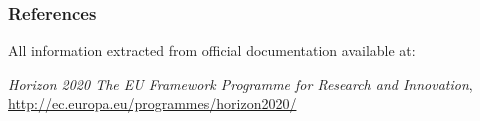 \documentclass[compress,9pt,xcolor={dvipsnames,table}]{beamer}
\begin{document}



    
    
 
    




\begin{frame}[t]\frametitle{References}
    All information extracted from official documentation available at:

    \emph{Horizon 2020 The EU Framework Programme for Research and Innovation}, \url{http://ec.europa.eu/programmes/horizon2020/}


\end{frame}
\end{document}
